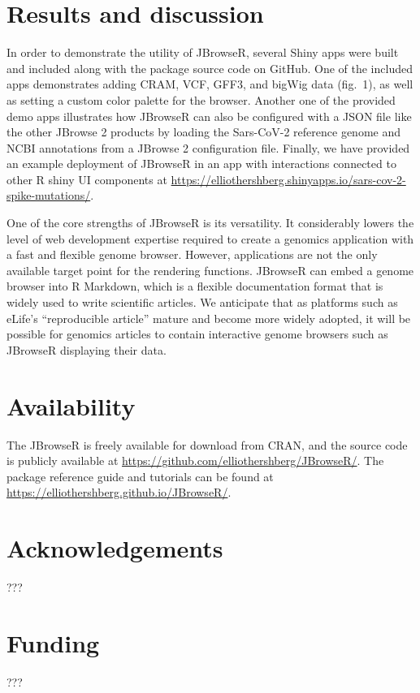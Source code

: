 \documentclass{bioinfo}
\begin{document}
\section{Results and discussion}

In order to demonstrate the utility of JBrowseR, several Shiny apps were
built and included along with the package source code on GitHub. One of
the included apps demonstrates adding CRAM, VCF, GFF3, and bigWig data
(fig.~1), as well as setting a custom color palette for the browser.
Another one of the provided demo apps illustrates how JBrowseR can also
be configured with a JSON file like the other JBrowse 2 products by
loading the Sars-CoV-2 reference genome and NCBI annotations from a
JBrowse 2 configuration file. Finally, we have provided an example
deployment of JBrowseR in an app with interactions connected to other R
shiny UI components at
\href{https://elliothershberg.shinyapps.io/sars-cov-2-spike-mutations/}{https://elliothershberg.shinyapps.io/sars-cov-2-spike-mutations/}.

One of the core strengths of JBrowseR is its versatility. It
considerably lowers the level of web development expertise required to
create a genomics application with a fast and flexible genome browser.
However, applications are not the only available target point for the
rendering functions. JBrowseR can embed a genome browser into R
Markdown, which is a flexible documentation format that is widely used
to write scientific articles. We anticipate that as platforms such as
eLife's ``reproducible article'' \citep{maciocci2019introducing} mature
and become more widely adopted, it will be possible for genomics
articles to contain interactive genome browsers such as JBrowseR
displaying their data.

\section{Availability}

The JBrowseR is freely available for download from CRAN, and the source
code is publicly available at
\href{https://github.com/elliothershberg/JBrowseR/}{https://github.com/elliothershberg/JBrowseR/}.
The package reference guide and tutorials can be found at
\href{https://elliothershberg.github.io/JBrowseR/}{https://elliothershberg.github.io/JBrowseR/}.

\section*{Acknowledgements}

???

\section*{Funding}

???




\end{document}

